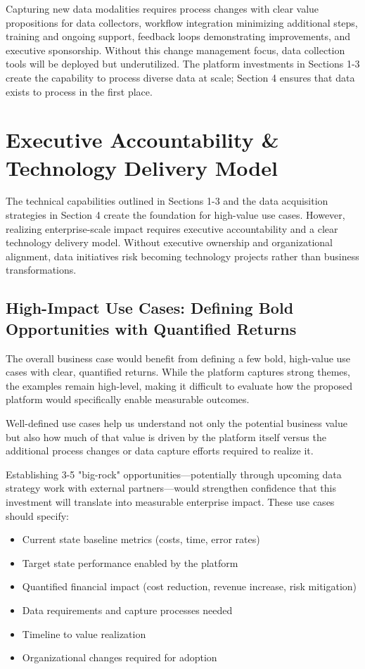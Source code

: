 \documentclass[12pt, a4paper]{article}
\begin{document}
Capturing new data modalities requires process changes with clear value propositions for data collectors, workflow integration minimizing additional steps, training and ongoing support, feedback loops demonstrating improvements, and executive sponsorship. Without this change management focus, data collection tools will be deployed but underutilized. The platform investments in Sections 1-3 create the capability to process diverse data at scale; Section 4 ensures that data exists to process in the first place.

\section{Executive Accountability \& Technology Delivery Model}

The technical capabilities outlined in Sections 1-3 and the data acquisition strategies in Section 4 create the foundation for high-value use cases. However, realizing enterprise-scale impact requires executive accountability and a clear technology delivery model. Without executive ownership and organizational alignment, data initiatives risk becoming technology projects rather than business transformations.

\subsection{High-Impact Use Cases: Defining Bold Opportunities with Quantified Returns}

The overall business case would benefit from defining a few bold, high-value use cases with clear, quantified returns. While the platform captures strong themes, the examples remain high-level, making it difficult to evaluate how the proposed platform would specifically enable measurable outcomes.

Well-defined use cases help us understand not only the potential business value but also how much of that value is driven by the platform itself versus the additional process changes or data capture efforts required to realize it.

Establishing 3-5 "big-rock" opportunities—potentially through upcoming data strategy work with external partners—would strengthen confidence that this investment will translate into measurable enterprise impact. These use cases should specify:

\begin{itemize}[leftmargin=*, nosep]
    \item Current state baseline metrics (costs, time, error rates)
    \item Target state performance enabled by the platform
    \item Quantified financial impact (cost reduction, revenue increase, risk mitigation)
    \item Data requirements and capture processes needed
    \item Timeline to value realization
    \item Organizational changes required for adoption
\end{itemize}
\end{document}
